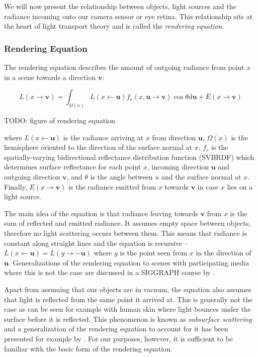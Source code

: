 We will now present the relationship between objects, light sources and the radiance incoming onto our camera sensor or eye retina. This relationship sits at the heart of light transport theory and is called the \textit{rendering equation}.

\subsubsection{Rendering Equation}
\label{section:background-projection_mapping-light_transport-rendering_equation}

The rendering equation describes the amount of outgoing radiance from point \(x\) in a scene towards a direction \(\mathbf{v}\):

\begin{equation}
    \label{eq:rendering_equation}
    L(x \rightarrow \mathbf{v}) = \int_{\Omega(x)} L(x \leftarrow \mathbf{u}) f_r(x, \mathbf{u} \rightarrow \mathbf{v}) \cos \theta \mathrm{d}\mathbf{u} + E(x \rightarrow \mathbf{v})
\end{equation}

{\color{red} TODO: figure of rendering equation}

where \(L(x \leftarrow \mathbf{u})\) is the radiance arriving at \(x\) from direction \(\mathbf{u}\), \(\Omega(x)\) is the hemisphere oriented to the direction of the surface normal at \(x\), \(f_r\) is the spatially-varying bidirectional reflectance distribution function (SVBRDF) which determines surface reflectance for each point \(x\), incoming direction \(\mathbf{u}\) and outgoing direction \(\mathbf{v}\), and \(\theta\) is the angle between \(u\) and the surface normal at \(x\). Finally, \(E(x \rightarrow \mathbf{v})\) is the radiance emitted from \(x\) towards \(\mathbf{v}\) in case \(x\) lies on a light source.

The main idea of the equation is that radiance leaving towards \(\mathbf{v}\) from \(x\) is the sum of reflected and emitted radiance. It assumes empty space between objects, therefore no light scattering occurs between them. This means that radiance is constant along straight lines and the equation is recursive -- \(L(x \leftarrow \mathbf{u}) = L(y \rightarrow -\mathbf{u})\) where \(y\) is the point seen from \(x\) in the direction of \(\mathbf{u}\). Generalizations of the rendering equation to scenes with participating media where this is not the case are discussed in a SIGGRAPH course by \citet{Novak2018}.

Apart from assuming that our objects are in vacuum, the equation also assumes that light is reflected from the same point it arrived at. This is generally not the case as can be seen for example with human skin where light bounces under the surface before it is reflected. This phenomenon is known as \textit{subsurface scattering} and a generalization of the rendering equation to account for it has been presented for example by \citet{Jensen2001}. For our purposes, however, it is sufficient to be familiar with the basic form of the rendering equation.

